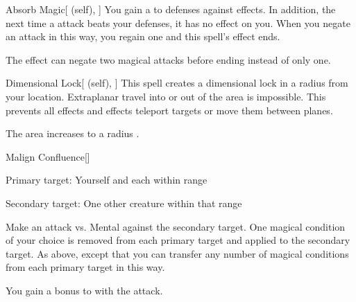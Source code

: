 \lowercase{\hypertarget{spell:Absorb Magic}{}}\label{spell:Absorb Magic}
\begin{attuneability}[Rank 6]{\hypertarget{spell:Absorb Magic}{Absorb Magic}}[ (self), ]
You gain a   to defenses against  effects.
In addition, the next time a  attack beats your defenses, it has no effect on you.
When you negate an attack in this way, you regain one  and this spell's effect ends.

\rankline
{} The effect can negate two magical attacks before ending instead of only one.
\end{attuneability}
\vspace{0.25em}



\lowercase{\hypertarget{spell:Dimensional Lock}{}}\label{spell:Dimensional Lock}
\begin{attuneability}[Rank 6]{\hypertarget{spell:Dimensional Lock}{Dimensional Lock}}[ (self), ]
\targetrule
This spell creates a dimensional lock in a \arealarge radius  from your location.
Extraplanar travel into or out of the area is impossible.
This prevents all  effects and effects teleport targets or move them between planes.

\rankline
{} The area increases to a \areahuge radius .
\end{attuneability}
\vspace{0.25em}



\lowercase{\hypertarget{spell:Malign Confluence}{}}\label{spell:Malign Confluence}
\begin{freeability}[Rank 6]{\hypertarget{spell:Malign Confluence}{Malign Confluence}}[]

Primary target: Yourself and each  within \rngmed range
\par\noindent
Secondary target: One other creature within that range

Make an attack vs. Mental against the secondary target.
\hit One magical condition of your choice is removed from each primary target and applied to the secondary target.
\crit As above, except that you can transfer any number of magical conditions from each primary target in this way.

\rankline
{} You gain a  bonus to  with the attack.
\end{freeability}
\vspace{0.25em}



